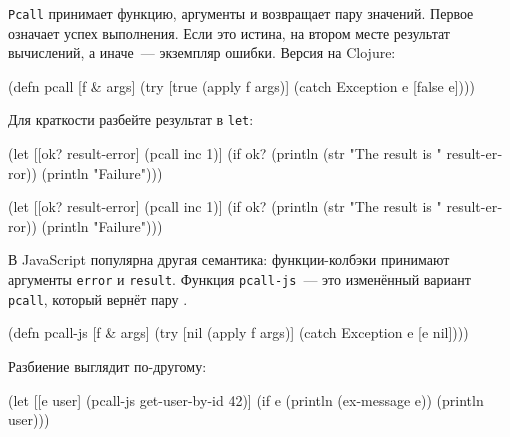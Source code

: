 \verb|Pcall| принимает функцию, аргументы и возвращает пару значений. Первое
означает успех выполнения. Если это истина, на втором месте результат
вычислений, а иначе~--- экземпляр ошибки. Версия на Clojure:


\begin{english}
  \begin{clojure}
(defn pcall [f & args]
  (try
    [true (apply f args)]
    (catch Exception e [false e])))
  \end{clojure}
\end{english}

Для краткости разбейте результат в \verb|let|:

\ifx\DEVICETYPE\MOBILE

\begin{english}
  \begin{clojure}
(let [[ok? result-error] (pcall inc 1)]
  (if ok?
    (println
      (str "The result is "
        result-error))
    (println "Failure")))
  \end{clojure}
\end{english}

\else

\begin{english}
  \begin{clojure}
(let [[ok? result-error] (pcall inc 1)]
  (if ok?
    (println (str "The result is " result-error))
    (println "Failure")))
  \end{clojure}
\end{english}

\fi


В JavaScript популярна другая семантика: функции-колбэки принимают аргументы
\verb|error| и \verb|result|. Функция \verb|pcall-js|~--- это изменённый
вариант \verb|pcall|, который вернёт пару .

\begin{english}
  \begin{clojure}
(defn pcall-js [f & args]
  (try
    [nil (apply f args)]
    (catch Exception e [e nil])))
  \end{clojure}
\end{english}

\noindent
Разбиение выглядит по-другому:

\ifx\DEVICETYPE\MOBILE

\begin{english}
  \begin{clojure}
(let [[e user]
      (pcall-js get-user-by-id 42)]
  (if e
    (println (ex-message e))
    (println user)))
  \end{clojure}
\end{english}

